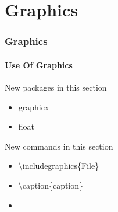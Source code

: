 \section{Graphics}
\begin{frame}
\frametitle{Graphics}
\framesubtitle{Use Of Graphics} 
\begin{exampleblock}{New packages in this section}
\begin{itemize}
\item graphicx 
\item float
\end{itemize}
\end{exampleblock}

\begin{block}{New commands in this section}
\begin{itemize}
\item \color{nounibaredI}\textbackslash includegraphics\color{black}\{File\}
\item \color{nounibaredI}\textbackslash caption\color{black}\{caption\}
\item {}
\end{itemize}
\end{block}

\end{frame}


